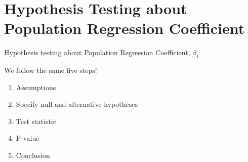 \documentclass[
  8pt,
  ignorenonframetext,
  dvipsnames]{beamer}
\providecommand{\tightlist}{%
  \setlength{\itemsep}{0pt}\setlength{\parskip}{0pt}}
\let\olditem\item
\renewcommand{\item}{%
  \olditem\vspace{4pt}
}
\begin{document}
\hypertarget{hypothesis-testing-about-population-regression-coefficient}{%
\section{Hypothesis Testing about Population Regression
Coefficient}\label{hypothesis-testing-about-population-regression-coefficient}}

\begin{frame}{Hypothesis testing about Population Regression
Coefficient, \(\beta_1\)}
\protect\hypertarget{hypothesis-testing-about-population-regression-coefficient-beta_1}{}

We follow the same five steps!

\begin{enumerate}
\tightlist
\item
  Assumptions
\item
  Specify null and alternative hypotheses
\item
  Test statistic
\item
  P-value
\item
  Conclusion
\end{enumerate}

\end{frame}
\end{document}
